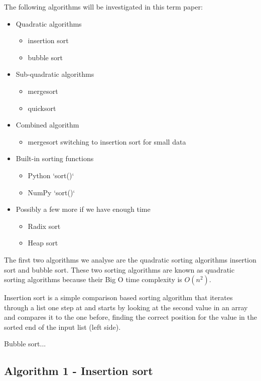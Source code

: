 \documentclass[sigconf, nonacm, natbib, screen, balance=False]{acmart}
\begin{document}
The following algorithms will be investigated in this term paper:
\begin{itemize}
\item Quadratic algorithms
  \begin{itemize}
  \item insertion sort
  \item bubble sort
  \end{itemize}
\item Sub-quadratic algorithms
  \begin{itemize}
  \item mergesort
  \item quicksort
  \end{itemize}
\item Combined algorithm
  \begin{itemize}
  \item mergesort switching to insertion sort for small data
  \end{itemize}
\item Built-in sorting functions
  \begin{itemize}
  \item Python `sort()`
  \item NumPy `sort()`
  \end{itemize}
\item Possibly a few more if we have enough time
  \begin{itemize}
  \item Radix sort
  \item Heap sort
  \end{itemize}
\end{itemize}

The first two algorithms we analyse are the quadratic sorting algorithms insertion sort and bubble sort. These two sorting algorithms are known as quadratic sorting algorithms because their Big O time complexity is $O(n^2)$.

Insertion sort is a simple comparison based sorting algorithm that iterates through a list one step at and starts by looking at the second value in an array and compares it to the one before, finding the correct position for the value in the sorted end of the input list (left side).

Bubble sort...

\subsection{Algorithm 1 - Insertion sort}\label{sec:algo1}
\end{document}

